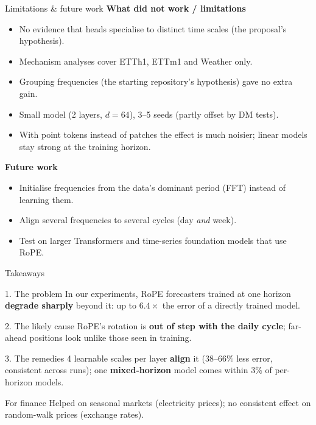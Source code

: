 \documentclass[aspectratio=169,xcolor=dvipsnames]{beamer}
\begin{document}
\begin{frame}{Limitations \& future work}
\textbf{What did not work / limitations}
\begin{itemize}
\item No evidence that heads specialise to distinct time scales (the proposal's hypothesis).
\item Mechanism analyses cover ETTh1, ETTm1 and Weather only.
\item Grouping frequencies (the starting repository's hypothesis) gave no extra gain.
\item Small model (2 layers, $d=64$), 3--5 seeds (partly offset by DM tests).
\item With point tokens instead of patches the effect is much noisier; linear models stay strong at the training horizon.
\end{itemize}
\textbf{Future work}
\begin{itemize}
\item Initialise frequencies from the data's dominant period (FFT) instead of learning them.
\item Align several frequencies to several cycles (day \emph{and} week).
\item Test on larger Transformers and time-series foundation models that use RoPE.
\end{itemize}
\end{frame}

\begin{frame}{Takeaways}
\vspace{-0.15cm}
\begin{block}{1. The problem}
In our experiments, RoPE forecasters trained at one horizon \textbf{degrade sharply} beyond it: up to $6.4\times$ the error of a directly trained model.
\end{block}
\begin{block}{2. The likely cause}
RoPE's rotation is \textbf{out of step with the daily cycle}; far-ahead positions look unlike those seen in training.
\end{block}
\begin{block}{3. The remedies}
4 learnable scales per layer \textbf{align} it (38--66\% less error, consistent across runs); one \textbf{mixed-horizon} model comes within 3\% of per-horizon models.
\end{block}
\begin{alertblock}{For finance}
Helped on seasonal markets (electricity prices); no consistent effect on random-walk prices (exchange rates).
\end{alertblock}
\end{frame}
\end{document}
